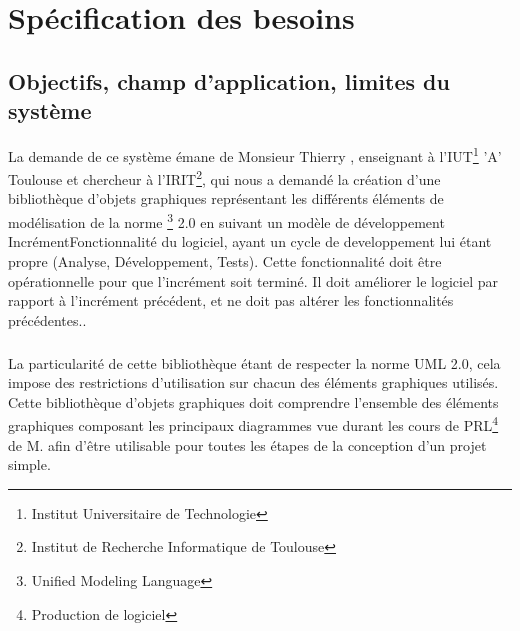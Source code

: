 \documentclass[12pt,a4paper,openany]{report}
\begin{document}
	\maketitle
	\newpage
	\tableofcontents
	
	\newpage
	\chapter{Spécification des besoins}
	\section{Objectifs, champ d'application, limites du système}
	La demande de ce système émane de Monsieur Thierry , enseignant à l'IUT\footnote{Institut Universitaire de Technologie}
	'A' Toulouse et chercheur à l'IRIT\footnote{Institut de Recherche Informatique de Toulouse},
	qui nous a demandé la création d'une bibliothèque d'objets graphiques représentant
	les différents éléments de modélisation de la norme 
	\footnote{Unified Modeling Language} 2.0 en suivant un modèle de développement 
	{Incrément}{Fonctionnalité du logiciel, ayant un cycle de developpement lui étant propre (Analyse, Développement, Tests).
	Cette fonctionnalité doit être opérationnelle pour que l'incrément soit terminé. Il doit améliorer le logiciel
	par rapport à l'incrément précédent, et ne doit pas altérer les fonctionnalités précédentes.}.
	\paragraph{}
	La particularité de cette bibliothèque étant de respecter la norme UML 2.0, cela impose des restrictions
	d'utilisation sur chacun des éléments graphiques utilisés.
	Cette bibliothèque d'objets graphiques doit comprendre l'ensemble des éléments graphiques composant
	les principaux diagrammes vue durant les cours de PRL\footnote{Production de logiciel} de M.  afin
	d'être utilisable pour toutes les étapes de la conception d'un projet simple. 
	
\end{document}
